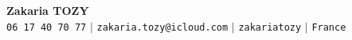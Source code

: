 \begin{center}
    \textbf{\Huge Zakaria TOZY} \\ \vspace{5pt}
    \small 
    \faPhone* \texttt{06 17 40 70 77} \hspace{1pt} $|$
    \faEnvelope \hspace{2pt} \texttt{zakaria.tozy@icloud.com} \hspace{1pt} $|$ 
    \faGithub \hspace{2pt} \texttt{zakariatozy} \hspace{1pt} $|$
    \faMapMarker* \hspace{2pt}\texttt{France}
    \\ \vspace{-3pt}
\end{center} 